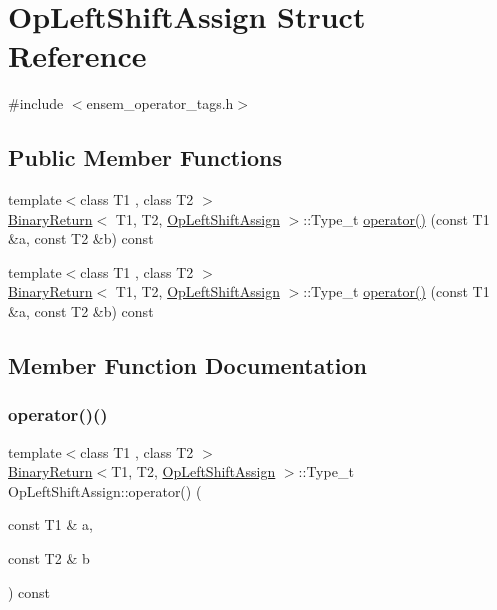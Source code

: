 \hypertarget{structOpLeftShiftAssign}{}\section{Op\+Left\+Shift\+Assign Struct Reference}
\label{structOpLeftShiftAssign}


{\ttfamily \#include $<$ensem\+\_\+operator\+\_\+tags.\+h$>$}

\subsection*{Public Member Functions}
\begin{DoxyCompactItemize}
\item 
{\footnotesize template$<$class T1 , class T2 $>$ }\\\mbox{\hyperlink{structBinaryReturn}{Binary\+Return}}$<$ T1, T2, \mbox{\hyperlink{structOpLeftShiftAssign}{Op\+Left\+Shift\+Assign}} $>$\+::Type\+\_\+t \mbox{\hyperlink{structOpLeftShiftAssign_a1606d84ca8d3445b33cbf098a7c3667e}{operator()}} (const T1 \&a, const T2 \&b) const
\item 
{\footnotesize template$<$class T1 , class T2 $>$ }\\\mbox{\hyperlink{structBinaryReturn}{Binary\+Return}}$<$ T1, T2, \mbox{\hyperlink{structOpLeftShiftAssign}{Op\+Left\+Shift\+Assign}} $>$\+::Type\+\_\+t \mbox{\hyperlink{structOpLeftShiftAssign_a1606d84ca8d3445b33cbf098a7c3667e}{operator()}} (const T1 \&a, const T2 \&b) const
\end{DoxyCompactItemize}


\subsection{Member Function Documentation}
\mbox{\label{structOpLeftShiftAssign_a1606d84ca8d3445b33cbf098a7c3667e}} 
\subsubsection{\texorpdfstring{operator()()}{operator()()}\hspace{0.1cm}{\footnotesize\ttfamily [1/2]}}
{\footnotesize\ttfamily template$<$class T1 , class T2 $>$ \\
\mbox{\hyperlink{structBinaryReturn}{Binary\+Return}}$<$T1, T2, \mbox{\hyperlink{structOpLeftShiftAssign}{Op\+Left\+Shift\+Assign}} $>$\+::Type\+\_\+t Op\+Left\+Shift\+Assign\+::operator() (\begin{DoxyParamCaption}\item[{const T1 \&}]{a,  }\item[{const T2 \&}]{b }\end{DoxyParamCaption}) const\hspace{0.3cm}{\ttfamily [inline]}}

